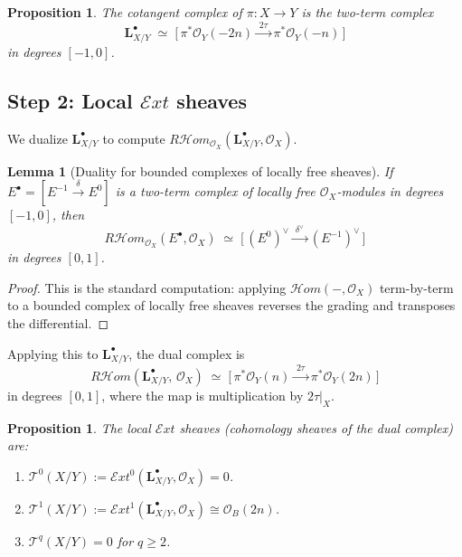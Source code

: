 \documentclass[11pt,twoside]{amsart}
\theoremstyle{plain}
\numberwithin{equation}{section}
\newtheorem{proposition}[theorem]{Proposition}
\newtheorem{lemma}[theorem]{Lemma}
\newcommand{\OO}{\mathcal{O}}
\theoremstyle{definition}
\newcommand{\LL}{\mathbf{L}}
\newcommand{\cT}{\mathcal{T}}
\newcommand{\cH}{\mathcal{H}}
\begin{document}
\begin{proposition}\label{prop:cotangent}
The cotangent complex of $\pi\colon X \to Y$ is the two-term complex
\[
\LL^\bullet_{X/Y} \;\simeq\; \Big[\,\pi^*\OO_Y(-2n) \xrightarrow{\;2\tau\;} \pi^*\OO_Y(-n)\,\Big]
\]
in degrees $[-1, 0]$.
\end{proposition}
 
\subsection{Step 2: Local $\mathcal{E}xt$ sheaves}
 
We dualize $\LL^\bullet_{X/Y}$ to compute $R\!\cH\!\mathit{om}_{\OO_X}(\LL^\bullet_{X/Y}, \OO_X)$.
 
\begin{lemma}[Duality for bounded complexes of locally free sheaves]\label{lem:dual}
If $E^\bullet = [E^{-1} \xrightarrow{\delta} E^0]$ is a two-term complex of locally free $\OO_X$-modules in degrees $[-1,0]$, then
\[
R\!\cH\!\mathit{om}_{\OO_X}(E^\bullet, \OO_X) \;\simeq\; \Big[\,(E^0)^\vee \xrightarrow{\;\delta^\vee\;} (E^{-1})^\vee\,\Big]
\]
in degrees $[0, 1]$.
\end{lemma}
 
\begin{proof}
This is the standard computation: applying $\cH\!\mathit{om}(-,\OO_X)$ term-by-term to a bounded complex of locally free sheaves reverses the grading and transposes the differential.
\end{proof}
 
Applying this to $\LL^\bullet_{X/Y}$, the dual complex is
\[
R\!\cH\!\mathit{om}(\LL^\bullet_{X/Y},\, \OO_X) \;\simeq\; \Big[\,\pi^*\OO_Y(n) \xrightarrow{\;2\tau\;} \pi^*\OO_Y(2n)\,\Big]
\]
in degrees $[0, 1]$, where the map is multiplication by $2\tau\big|_X$.
 
\begin{proposition}\label{prop:local_ext}
The local $\mathcal{E}xt$ sheaves (cohomology sheaves of the dual complex) are:
\begin{enumerate}
\item[\textup{(i)}] $\cT^0(X/Y) := \mathcal{E}\mathit{xt}^0(\LL^\bullet_{X/Y}, \OO_X) = 0$.
\item[\textup{(ii)}] $\cT^1(X/Y) := \mathcal{E}\mathit{xt}^1(\LL^\bullet_{X/Y}, \OO_X) \cong \OO_B(2n)$.
\item[\textup{(iii)}] $\cT^q(X/Y) = 0$ for $q \geq 2$.
\end{enumerate}
\end{proposition}
 
\end{document}
